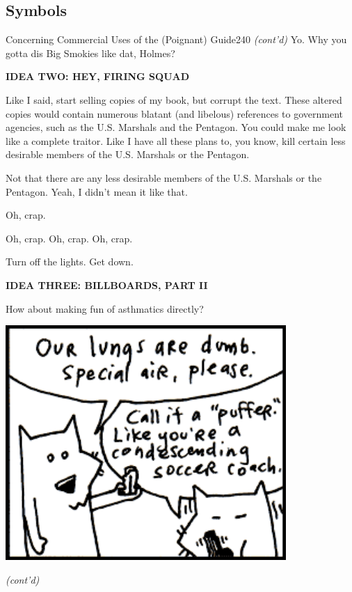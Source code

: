 \documentclass[10pt,twoside]{report}
\begin{document}
\pagebreak
\subsection{Symbols}

	\begin{sidebar}{Concerning Commercial Uses of the (Poignant) Guide}{240}
		\textit{(cont'd)} Yo. Why you gotta dis Big Smokies like dat, Holmes?\vspace{6pt}
		
		\textbf{IDEA TWO: HEY, FIRING SQUAD}\vspace{6pt}
		
		Like I said, start selling copies of my book, but corrupt the text. These altered copies would contain numerous blatant (and libelous) references to government agencies, such as the U.S. Marshals and the Pentagon. You could make me look like a complete traitor. Like I have all these plans to, you know, kill certain less desirable members of the U.S. Marshals or the Pentagon.\vspace{6pt}
		
		Not that there are any less desirable members of the U.S. Marshals or the Pentagon. Yeah, I didn't mean it like that.\vspace{6pt}
		
		Oh, crap.\vspace{6pt}
		
		Oh, crap. Oh, crap. Oh, crap.\vspace{6pt}
		
		Turn off the lights. Get down.\vspace{6pt}
		
		\textbf{IDEA THREE: BILLBOARDS, PART II}\vspace{6pt}
		
		How about making fun of asthmatics directly?\vspace{6pt}
		
		\hfill
		\includegraphics[width=0.8\textwidth]{cache/sidebar312.png}
		\hspace*{\fill}
		
		\textit{(cont'd)}
	\end{sidebar}
\end{document}
